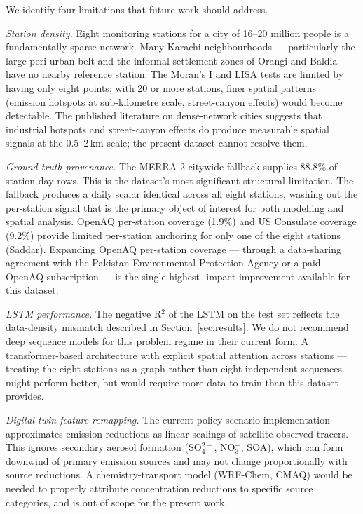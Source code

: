 \documentclass{iopjournal}
\begin{document}
We identify four limitations that future work should address.

\textit{Station density.} Eight monitoring stations for a city of
16--20 million people is a fundamentally sparse network. Many
Karachi neighbourhoods --- particularly the large peri-urban belt
and the informal settlement zones of Orangi and Baldia --- have no
nearby reference station. The Moran's I and LISA tests are limited
by having only eight points; with 20 or more stations, finer
spatial patterns (emission hotspots at sub-kilometre scale,
street-canyon effects) would become detectable. The published
literature on dense-network cities suggests that industrial
hotspots and street-canyon effects do produce measurable spatial
signals at the 0.5--2\,km scale; the present dataset cannot
resolve them.

\textit{Ground-truth provenance.} The MERRA-2 citywide fallback
supplies 88.8\% of station-day rows. This is the dataset's most
significant structural limitation. The fallback produces a daily
scalar identical across all eight stations, washing out the
per-station signal that is the primary object of interest for
both modelling and spatial analysis. OpenAQ per-station coverage
(1.9\%) and US Consulate coverage (9.2\%) provide limited
per-station anchoring for only one of the eight stations
(Saddar). Expanding OpenAQ per-station coverage --- through a
data-sharing agreement with the Pakistan Environmental Protection
Agency or a paid OpenAQ subscription --- is the single highest-
impact improvement available for this dataset.

\textit{LSTM performance.} The negative R$^{2}$ of the LSTM on the
test set reflects the data-density mismatch described in
Section~\ref{sec:results}. We do not recommend deep sequence
models for this problem regime in their current form. A
transformer-based architecture with explicit spatial attention
across stations --- treating the eight stations as a graph rather
than eight independent sequences --- might perform better, but
would require more data to train than this dataset provides.

\textit{Digital-twin feature remapping.} The current policy
scenario implementation approximates emission reductions as
linear scalings of satellite-observed tracers. This ignores
secondary aerosol formation (SO$_4^{2-}$, NO$_3^{-}$, SOA), which
can form downwind of primary emission sources and may not change
proportionally with source reductions. A chemistry-transport model
(WRF-Chem, CMAQ) would be needed to properly attribute
concentration reductions to specific source categories, and is
out of scope for the present work.
\end{document}
